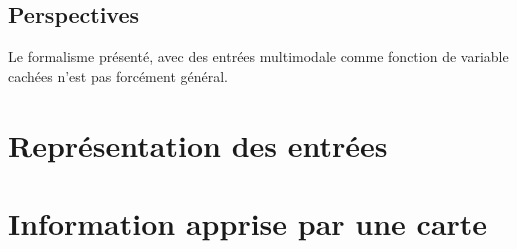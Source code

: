 \subsection{Perspectives}

Le formalisme présenté, avec des entrées multimodale comme fonction de variable cachées n'est pas forcément général.  

\section{Représentation des entrées}



\section{Information apprise par une carte}

%
%
%






